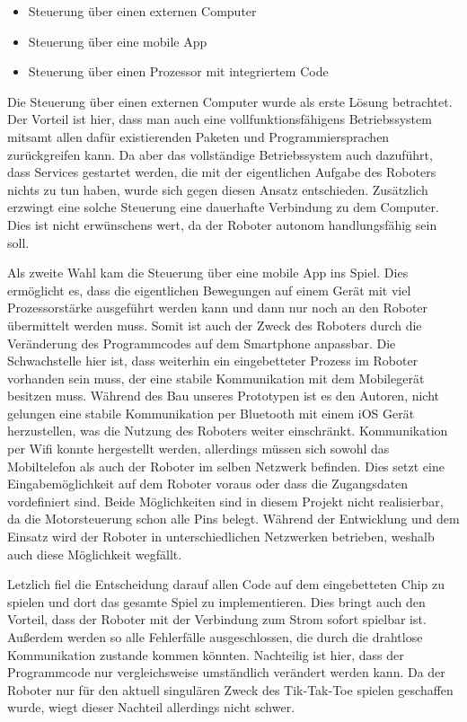\documentclass[conference,compsoc,final,a4paper]{IEEEtran}
\begin{document}
\begin{itemize}
  \item Steuerung über einen externen Computer
  \item Steuerung über eine mobile App
  \item Steuerung über einen Prozessor mit integriertem Code
\end{itemize}

Die Steuerung über einen externen Computer wurde als erste Lösung betrachtet. Der Vorteil
ist hier, dass man auch eine vollfunktionsfähigens Betriebssystem mitsamt allen dafür existierenden
Paketen und Programmiersprachen zurückgreifen kann. Da aber das vollständige Betriebssystem auch
dazuführt, dass Services gestartet werden, die mit der eigentlichen Aufgabe des Roboters nichts zu
tun haben, wurde sich gegen diesen Ansatz entschieden. Zusätzlich erzwingt eine solche Steuerung
eine dauerhafte Verbindung zu dem Computer. Dies ist nicht erwünschens wert, da der Roboter autonom
handlungsfähig sein soll.

Als zweite Wahl kam die Steuerung über eine mobile App ins Spiel. Dies ermöglicht es, dass die
eigentlichen Bewegungen auf einem Gerät mit viel Prozessorstärke ausgeführt werden kann und dann nur
noch an den Roboter übermittelt werden muss. Somit ist auch der Zweck des Roboters
durch die Veränderung des Programmcodes auf dem Smartphone anpassbar. Die Schwachstelle hier ist,
dass weiterhin ein eingebetteter Prozess im Roboter vorhanden sein muss, der eine stabile
Kommunikation mit dem Mobilegerät besitzen muss. Während des Bau unseres Prototypen ist es den Autoren,
nicht gelungen eine stabile Kommunikation per Bluetooth mit einem iOS Gerät herzustellen,
was die Nutzung des Roboters weiter einschränkt. Kommunikation per Wifi konnte hergestellt werden,
allerdings müssen sich sowohl das Mobiltelefon als auch der Roboter im 
selben Netzwerk befinden. Dies setzt eine Eingabemöglichkeit auf dem Roboter voraus oder dass
die Zugangsdaten vordefiniert sind. Beide Möglichkeiten sind in diesem Projekt nicht realisierbar,
da die Motorsteuerung schon alle Pins belegt. Während der Entwicklung und dem Einsatz wird der Roboter
in unterschiedlichen Netzwerken betrieben, weshalb auch diese Möglichkeit wegfällt.

Letzlich fiel die Entscheidung darauf allen Code auf dem eingebetteten Chip zu spielen und dort
das gesamte Spiel zu implementieren. Dies bringt auch den Vorteil, dass der Roboter mit der Verbindung
zum Strom sofort spielbar ist. Außerdem werden so alle Fehlerfälle ausgeschlossen, die durch die
drahtlose Kommunikation zustande kommen könnten. Nachteilig ist hier, dass der Programmcode nur
vergleichsweise umständlich verändert werden kann. Da der Roboter nur für den aktuell singulären
Zweck des Tik-Tak-Toe spielen geschaffen wurde, wiegt dieser Nachteil allerdings nicht schwer.
\end{document}

